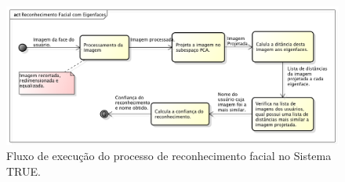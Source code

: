 			\begin{figure}[htb]
			\begin{center}
				\includegraphics[scale=0.5]{figuras/4.ProblemaEProposta/diagrama-reconhecimento2.png}
			\end{center}
			\caption{Fluxo de execução do processo de reconhecimento facial no Sistema TRUE.}
			\label{fig:diagrama-reconhecimento}
		\end{figure}



